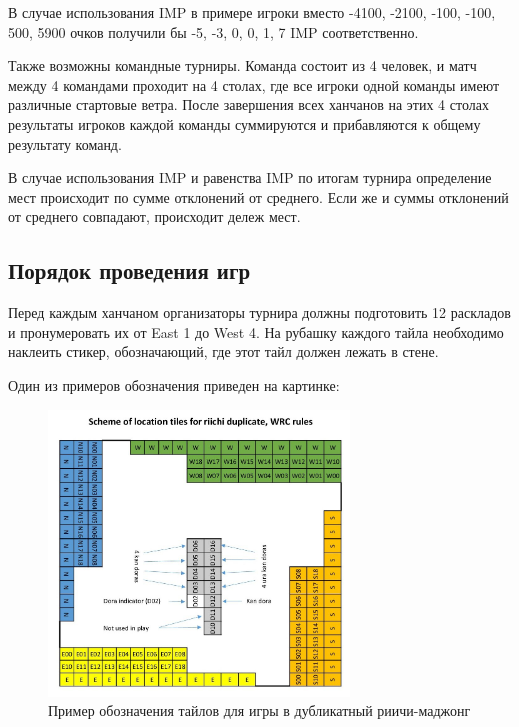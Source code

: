 \begin{additional}
\vspace{0.3cm}

В случае использования IMP в примере игроки вместо -4100, -2100, -100, -100, 500, 5900 очков получили бы -5, -3, 0, 0, 1, 7 IMP соответственно.

\vspace{0.3cm}

Также возможны командные турниры. Команда состоит из 4 человек, и матч между 4 командами проходит на 4 столах, где все игроки одной команды имеют различные стартовые ветра. После завершения всех ханчанов на этих 4 столах результаты игроков каждой команды суммируются и прибавляются к общему результату команд.

\vspace{0.3cm}

В случае использования IMP и равенства IMP по итогам турнира определение мест происходит по сумме отклонений от среднего. Если же и суммы отклонений от среднего совпадают, происходит дележ мест.

\subsection{Порядок проведения игр}

Перед каждым ханчаном организаторы турнира должны подготовить 12 раскладов и пронумеровать их от East 1 до West 4. На рубашку каждого тайла необходимо наклеить стикер, обозначающий, где этот тайл должен лежать в стене.

Один из примеров обозначения приведен на картинке:

\begin{figure}[H]
	\centering
	\includegraphics[width=8cm]{img/duplicate_marks.jpg}
	\caption{Пример обозначения тайлов для игры в дубликатный риичи-маджонг}
\end{figure}


\end{additional}
